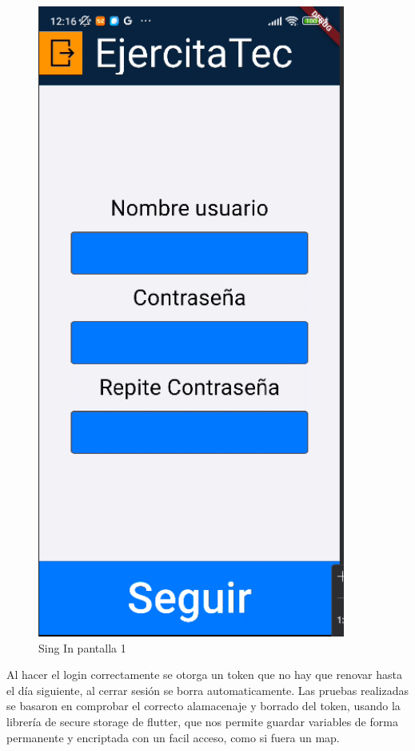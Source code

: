\begin{figure}[H]
\begin{minipage}{0.45\textwidth}
      \centering
      \includegraphics[width=0.9\textwidth]{pantallas/SingIn1.png}
      \caption{Sing In pantalla 1}
      \label{fig:SingIn1}
   \end{minipage}
\end{figure}

Al hacer el login correctamente se otorga un token que no hay que renovar hasta el día siguiente, al cerrar sesión se borra automaticamente. Las pruebas realizadas se basaron en comprobar el correcto alamacenaje y borrado del token, usando la librería de secure storage de flutter, que nos permite guardar variables de forma permanente y encriptada con un facil acceso, como si fuera un map.

